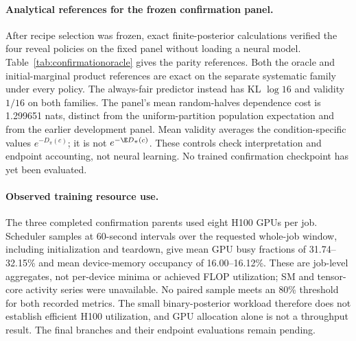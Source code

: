 \paragraph{Analytical references for the frozen confirmation panel.}
After recipe selection was frozen, exact finite-posterior calculations verified the four reveal policies on the fixed panel without loading a neural model. Table~\ref{tab:confirmationoracle} gives the parity references. Both the oracle and initial-marginal product references are exact on the separate systematic family under every policy. The always-fair predictor instead has KL $\log16$ and validity $1/16$ on both families. The panel's mean random-halves dependence cost is 1.299651 nats, distinct from the uniform-partition population expectation and from the earlier development panel. Mean validity averages the condition-specific values $e^{-D_\pi(c)}$; it is not $e^{-\E D_\pi(c)}$. These controls check interpretation and endpoint accounting, not neural learning. No trained confirmation checkpoint has yet been evaluated.


\paragraph{Observed training resource use.}
The three completed confirmation parents used eight H100 GPUs per job. Scheduler samples at 60-second intervals over the requested whole-job window, including initialization and teardown, give mean GPU busy fractions of 31.74--32.15\% and mean device-memory occupancy of 16.00--16.12\%. These are job-level aggregates, not per-device minima or achieved FLOP utilization; SM and tensor-core activity series were unavailable. No paired sample meets an 80\% threshold for both recorded metrics. The small binary-posterior workload therefore does not establish efficient H100 utilization, and GPU allocation alone is not a throughput result. The final branches and their endpoint evaluations remain pending.
